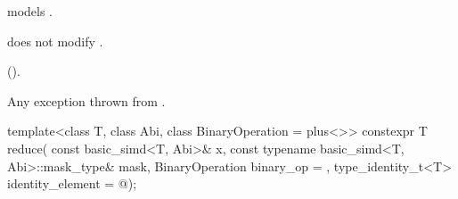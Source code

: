 \begin{itemdescr}
  \pnum\constraints
   models .

  \pnum\expects
   does not modify .

  \pnum\returns
  ().

  \pnum\throws
  Any exception thrown from .
\end{itemdescr}

\begin{itemdecl}
template<class T, class Abi, class BinaryOperation = plus<>>
  constexpr T reduce(
    const basic_simd<T, Abi>& x, const typename basic_simd<T, Abi>::mask_type& mask,
    BinaryOperation binary_op = {}, type_identity_t<T> identity_element = @\seebelow@);
\end{itemdecl}

